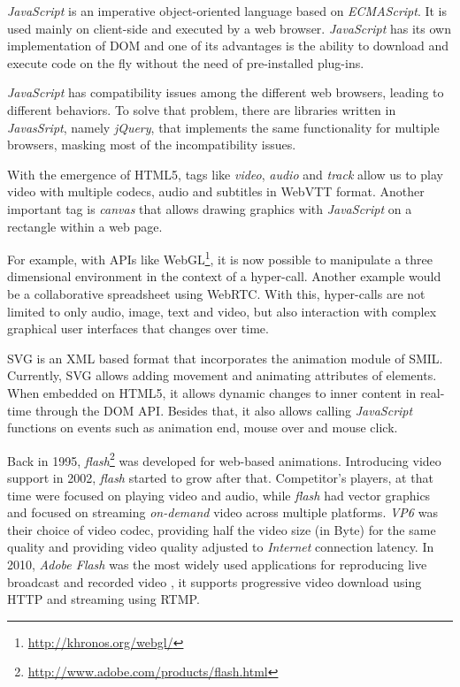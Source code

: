   \emph{JavaScript} is an imperative object-oriented language based on \emph{ECMAScript}. It is used mainly on client-side and executed by a web browser. \emph{JavaScript} has its own implementation of \ac{DOM} and one of its advantages is the ability to download and execute code on the fly without the need of pre-installed plug-ins.

  \emph{JavaScript} has compatibility issues among the different web browsers, leading to different behaviors. To solve that problem, there are libraries written in \emph{JavasSript}, namely \emph{jQuery}, that implements the same functionality for multiple browsers, masking most of the incompatibility issues.

  With the emergence of \ac{HTML}5, tags like \emph{video}, \emph{audio} and \emph{track} allow us to play video with multiple codecs, audio and subtitles in \ac{WebVTT} format. Another important tag is \emph{canvas} that allows drawing graphics with \emph{JavaScript} on a rectangle within a web page.

  For example, with \ac{API}s like WebGL\footnote{\url{http://khronos.org/webgl/}}, it is now possible to manipulate a three dimensional environment in the context of a hyper-call. Another example would be a collaborative spreadsheet using \ac{WebRTC}. With this, hyper-calls are not limited to only audio, image, text and video, but also interaction with complex graphical user interfaces that changes over time.


  \ac{SVG} is an \ac{XML} based format that incorporates the animation module of \ac{SMIL}. Currently, \ac{SVG} allows adding movement and animating attributes of elements. When embedded on \ac{HTML}5, it allows dynamic changes to inner content in real-time through the \ac{DOM} \ac{API}. Besides that, it also allows calling \emph{JavaScript} functions on events such as animation end, mouse over and mouse click.
  
  Back in 1995, \emph{flash}\footnote{\url{http://www.adobe.com/products/flash.html}} was developed for web-based animations. Introducing video support in 2002, \emph{flash} started to grow after that. Competitor's players, at that time were focused on playing video and audio, while \emph{flash} had vector graphics and focused on streaming \emph{on-demand} video across multiple platforms. \emph{VP6} was their choice of video codec, providing half the video size (in Byte) for the same quality and providing video quality adjusted to \emph{Internet} connection latency. 
  In 2010, \emph{Adobe Flash} was the most widely used applications for reproducing live broadcast and recorded video \cite{flashvideo}, it supports progressive video download using \ac{HTTP} and streaming using \ac{RTMP}.

